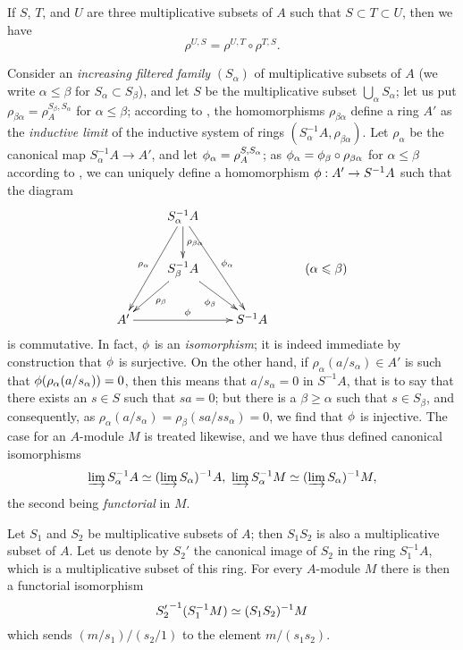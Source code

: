 \begin{env}[1.4.4]
\label{0.1.4.4}
If $S$, $T$, and $U$ are three multiplicative subsets of $A$ such that $S\subset T\subset U$, then we have
\[
  \rho^{U,S}=\rho^{U,T}\circ\rho^{T,S}.
\]
\end{env}

\begin{env}[1.4.5]
\label{0.1.4.5}
Consider an \emph{increasing filtered family} $(S_\alpha)$ of multiplicative
subsets of $A$ (we write $\alpha\leq\beta$ for $S_\alpha\subset S_\beta$),
and let $S$ be the multiplicative subset $\bigcup_\alpha S_\alpha$; let us put
$\rho_{\beta\alpha}=\rho_A^{S_\beta,S_\alpha}$ for $\alpha\leq\beta$;
according to , the homomorphisms $\rho_{\beta\alpha}$ define a
ring $A'$ as the \emph{inductive limit} of the inductive system of rings
$(S_\alpha^{-1}A,\rho_{\beta\alpha})$.
Let $\rho_\alpha$ be the canonical map $S_\alpha^{-1}A\to A'$, and let $\phi_\alpha=\rho_A^{S,S_\alpha}$; as
$\phi_\alpha=\phi_\beta\circ\rho_{\beta\alpha}$ for $\alpha\leq\beta$
according to , we can uniquely define a homomorphism $\vphi:A'\to S^{-1}A$ such that the diagram
\[
  \xymatrix{
    & S_\alpha^{-1}A\ar[ddl]_{\rho_\alpha}\ar[d]^{\rho_{\beta\alpha}}\ar[rdd]^{\vphi_\alpha}\\
    & S_\beta^{-1}A\ar[ld]^{\rho_\beta}\ar[rd]_{\vphi_\beta}
    & & (\alpha\leq\beta)\\
    A'\ar[rr]^\vphi & &
    S^{-1}A
  }
\]
is commutative.
In fact, $\phi$ is an \emph{isomorphism}; it is indeed immediate by construction that $\phi$ is surjective.
On the other hand, if $\rho_\alpha(a/s_\alpha)\in A'$ is such that $\phi(\rho_\alpha(a/s_\alpha))=0$, then this means that $a/s_\alpha=0$ in $S^{-1}A$, that is to say that there exists an $s\in S$ such that $sa=0$; but there is a $\beta\geq\alpha$ such that $s\in S_\beta$, and consequently, as $\rho_\alpha(a/s_\alpha)=\rho_\beta(sa/ss_\alpha)=0$, we find that $\phi$ is injective.
The case for an $A$-module $M$ is treated likewise, and we have thus defined canonical isomorphisms
\[
  \varinjlim S_\alpha^{-1}A\simeq(\varinjlim S_\alpha)^{-1}A,\
  \varinjlim S_\alpha^{-1}M\simeq(\varinjlim S_\alpha)^{-1}M,
\]
the second being \emph{functorial} in $M$.
\end{env}

\begin{env}[1.4.6]
\label{0.1.4.6}
Let $S_1$ and $S_2$ be multiplicative subsets of $A$; then $S_1 S_2$ is also a
multiplicative subset of $A$. Let us denote by $S_2'$ the canonical image of
$S_2$ in the ring $S_1^{-1}A$, which is a multiplicative subset of this ring.
For every $A$-module $M$ there is then a functorial isomorphism
\[
  {S_2'}^{-1}(S_1^{-1}M)\simeq(S_1 S_2)^{-1}M
\]
which sends $(m/s_1)/(s_2/1)$ to the element $m/(s_1 s_2)$.
\end{env}

